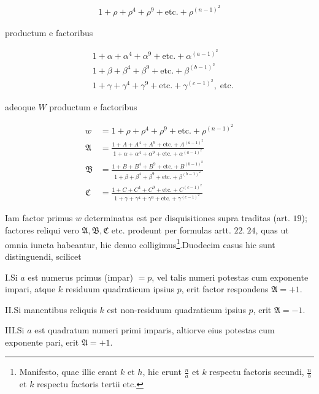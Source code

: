 \[
\begin{aligned}
1+\rho+\rho^4+\rho^9+\text{etc.}+\rho^{(n-1)^2}
\end{aligned}
\]

productum e factoribus

\[
\begin{aligned}
&1+\alpha+\alpha^4+\alpha^9+\text{etc.}+\alpha^{(a-1)^2}\\
&1+\beta+\beta^4+\beta^9+\text{etc.}+\beta^{(b-1)^2}\\
&1+\gamma+\gamma^4+\gamma^9+\text{etc.}+\gamma^{(c-1)^2},\;\text{etc.}
\end{aligned}
\]

%
adeoque $W$ productum e factoribus

\[
\begin{aligned}
w&=1+\rho+\rho^4+\rho^9+\text{etc.}+\rho^{(n-1)^2}\\[2pt]
\mathfrak A&=\frac{1+A+A^4+A^9+\text{etc.}+A^{(a-1)^2}}{1+\alpha+\alpha^4+\alpha^9+\text{etc.}+\alpha^{(a-1)^2}}\\[2pt]
\mathfrak B&=\frac{1+B+B^4+B^9+\text{etc.}+B^{(b-1)^2}}{1+\beta+\beta^4+\beta^9+\text{etc.}+\beta^{(b-1)^2}}\\[2pt]
\mathfrak C&=\frac{1+C+C^4+C^9+\text{etc.}+C^{(c-1)^2}}{1+\gamma+\gamma^4+\gamma^9+\text{etc.}+\gamma^{(c-1)^2}}
\end{aligned}
\]

Iam factor primus $w$ determinatus est per disquisitiones supra traditas (art. $19$); factores reliqui vero $\mathfrak A,\mathfrak B,\mathfrak C$ etc. prodeunt per formulas artt. $22.\ 24$, quas ut omnia iuncta habeantur, hic denuo colligimus\begingroup\renewcommand{\thefootnote}{*)}\footnote{Manifesto, quae illic erant $k$ et $h$, hic erunt $\frac{n}{a}$ et $k$ respectu factoris secundi, $\frac{n}{b}$ et $k$ respectu factoris tertii etc.}\endgroup.\quad Duodecim casus hic sunt distinguendi, scilicet

I.\quad Si $a$ est numerus primus (impar) $=p$, vel talis numeri potestas cum exponente impari, atque $k$ residuum quadraticum ipsius $p$, erit factor respondens $\mathfrak A=+1$.

II.\quad Si manentibus reliquis $k$ est non-residuum quadraticum ipsius $p$, erit $\mathfrak A=-1$.

III.\quad Si $a$ est quadratum numeri primi imparis, altiorve eius potestas cum exponente pari, erit $\mathfrak A=+1$.

